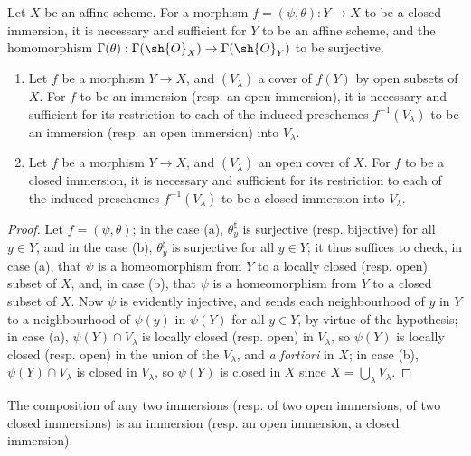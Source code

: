 \begin{corollary}[4.2.3]
\label{I.4.2.3}
Let $X$ be an affine scheme.
For a morphism $f=(\psi,\theta):Y\to X$ to be a closed immersion, it is necessary and sufficient for $Y$ to be an affine scheme, and the homomorphism $\Gamma(\theta):\Gamma(\sh{O}_X)\to\Gamma(\sh{O}_Y)$ to be surjective.
\end{corollary}

\begin{corollary}[4.2.4]
\label{I.4.2.4}
\medskip\noindent
\begin{enumerate}
  \item[{\rm(a)}] Let $f$ be a morphism $Y\to X$, and $(V_\lambda)$ a cover of $f(Y)$ by open subsets of $X$.
    For $f$ to be an immersion (resp. an open immersion), it is necessary and sufficient
    for its restriction to each of the induced preschemes $f^{-1}(V_\lambda)$ to be an immersion (resp. an open immersion) into $V_\lambda$.
  \item[{\rm(b)}] Let $f$ be a morphism $Y\to X$, and $(V_\lambda)$ an open cover of $X$.
    For $f$ to be a closed immersion, it is necessary and sufficient for its restriction to each of the induced preschemes $f^{-1}(V_\lambda)$ to be a closed immersion into $V_\lambda$.
\end{enumerate}
\end{corollary}

\begin{proof}
Let $f=(\psi,\theta)$;
in the case (a), $\theta_y^\sharp$ is surjective (resp. bijective) for all $y\in Y$, and in the case (b), $\theta_y^\sharp$ is surjective for all $y\in Y$;
it thus suffices to check, in case (a), that $\psi$ is a homeomorphism from $Y$ to a locally closed (resp. open) subset of $X$, and, in case (b), that $\psi$ is a homeomorphism from $Y$ to a closed subset of $X$.
Now $\psi$ is evidently injective, and sends each neighbourhood of $y$ in $Y$ to a neighbourhood of $\psi(y)$ in $\psi(Y)$ for all $y\in Y$, by virtue of the hypothesis;
in case (a), $\psi(Y)\cap V_\lambda$ is locally closed (resp. open) in $V_\lambda$, so $\psi(Y)$ is locally closed (resp. open) in the union of the $V_\lambda$, and \emph{a fortiori} in $X$;
in case (b), $\psi(Y)\cap V_\lambda$ is closed in $V_\lambda$, so $\psi(Y)$ is closed in $X$ since $X=\bigcup_\lambda V_\lambda$.
\end{proof}

\begin{proposition}[4.2.5]
\label{I.4.2.5}
The composition of any two immersions (resp. of two open immersions, of two closed immersions) is an immersion (resp. an open immersion, a closed immersion).
\end{proposition}

